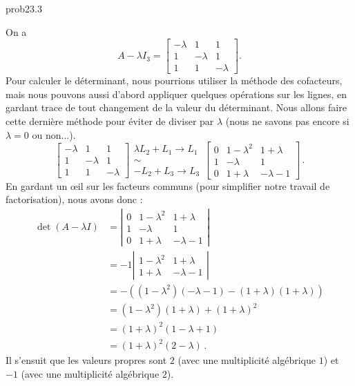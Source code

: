 \begin{sol}{prob23.3}
\begin{enumerate}[a)]
\soln  On a
$$
A-\lambda I_3 = \begin{bmatrix}
-\lambda &1&1\\ 1&-\lambda &1\\ 1&1&-\lambda \end{bmatrix}.
$$
Pour calculer le déterminant, nous pourrions utiliser la m\'ethode des cofacteurs, mais  nous pouvons aussi d'abord appliquer quelques opérations sur les lignes, en gardant trace de tout changement de la valeur du déterminant. Nous allons faire cette dernière méthode pour éviter de diviser par $\lambda$ (nous ne savons pas encore si $\lambda=0$ ou non...).
$$
\begin{bmatrix}
-\lambda &1&1\\ 
1&-\lambda &1\\ 
1&1&-\lambda \end{bmatrix} \begin{matrix} \lambda L_2+L_1 \to L_1\\ \sim \\ -L_2+L_3 \to L_3\end{matrix}
\begin{bmatrix}
0 &1-\lambda^2&1+\lambda\\ 
1&-\lambda &1\\ 
0&1+\lambda&-\lambda-1 \end{bmatrix} \,.
$$
En gardant un œil sur les facteurs communs (pour simplifier notre travail de factorisation), nous avons donc :
\begin{align*}
\det( A-\lambda I)&= \left\vert \begin{matrix}
0 &1-\lambda^2&1+\lambda\\ 
1&-\lambda &1\\ 
0&1+\lambda&-\lambda-1 \end{matrix}\right| \\
&= -1\left|\begin{matrix}1-\lambda^2 & 1+\lambda \\ 1 + \lambda & -\lambda - 1\end{matrix}\right|\\
&= -((1-\lambda^2)(-\lambda - 1) - (1+\lambda)(1+\lambda)) \\
& = (1-\lambda^2)(1+\lambda) + (1+\lambda)^2\\
&= (1+\lambda)^2( 1-\lambda+1) \\
&= (1+\lambda)^2(2-\lambda)\,.
\end{align*}
Il s'ensuit que les valeurs propres sont $2$ (avec une multiplicité algébrique $1$) et $-1$ (avec une multiplicité algébrique $2$).


\end{enumerate}
\end{sol}
